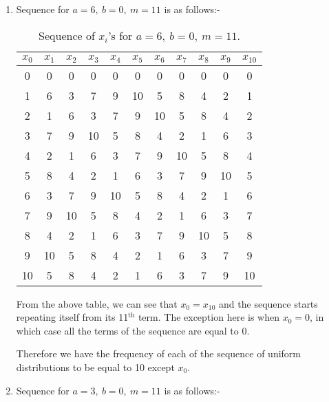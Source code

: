 \documentclass[10pt]{article}
\begin{document}
\begin{enumerate}

\item Sequence for $a = 6,\: b = 0,\: m = 11$ is as follows:- \medskip

\begin{table}[H]
\begin{center}
\begin{tabular}{|c|c|c|c|c|c|c|c|c|c|c|}
\hline
\rule{0pt}{3ex} $x_0$ & $x_1$ & $x_2$ & $x_3$  & $x_4$ & $x_5$ & $x_6$ & $x_7$ & $x_8$ & $x_9$ & $x_{10}$\\
\hline
0 & 0 & 0 & 0 & 0 & 0 & 0 & 0 & 0 & 0 & 0 \\
\hline
1 & 6 & 3 & 7 & 9 & 10 & 5 & 8 & 4 & 2 & 1 \\
\hline
2 & 1 & 6 & 3 & 7 & 9 & 10 & 5 & 8 & 4 & 2 \\
\hline
3 & 7 & 9 & 10 & 5 & 8 & 4 & 2 & 1 & 6 & 3 \\
\hline
4 & 2 & 1 & 6 & 3 & 7 & 9 & 10 & 5 & 8 & 4 \\
\hline
5 & 8 & 4 & 2 & 1 & 6 & 3 & 7 & 9 & 10 & 5 \\
\hline
6 & 3 & 7 & 9 & 10 & 5 & 8 & 4 & 2 & 1 & 6 \\
\hline
7 & 9 & 10 & 5 & 8 & 4 & 2 & 1 & 6 & 3 & 7 \\
\hline
8 & 4 & 2 & 1 & 6 & 3 & 7 & 9 & 10 & 5 & 8 \\
\hline
9 & 10 & 5 & 8 & 4 & 2 & 1 & 6 & 3 & 7 & 9 \\
\hline
10 & 5 & 8 & 4 & 2 & 1 & 6 & 3 & 7 & 9 & 10 \\
\hline
\end{tabular}
\end{center}
\caption{Sequence of $x_i$'s for $a = 6,\: b = 0,\: m = 11$.}
\label{tab:q1_seq1}
\end{table}
\medskip

From the above table, we can see that $x_0 = x_{10}$ and the sequence starts repeating itself from its 11$^{\textrm{th}}$ term. The exception here is when $x_0 = 0$, in which case all the terms of the sequence are equal to 0.\medskip

Therefore we have the frequency of each of the sequence of uniform distributions to be equal to 10 except $x_0$.

\pagebreak

\item Sequence for $a = 3,\: b = 0,\: m = 11$  is as follows:- \medskip


\end{enumerate}
\end{document}
